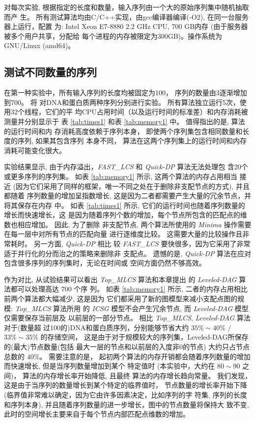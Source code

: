 对每次实验, 根据指定的长度和数量，输入序列由一个大的原始序列集中随机抽取而产
生。 所有测试算法均由C/C++实现，由gcc编译器编译(-O2), 在同一台服务器上运行，配置
为: Intel Xeon E7-8880 2.2 GHz CPU, 700 GB内存 (由于服务器被多个用户共享，分配给
每个进程的内存被限定为300GB)。操作系统为 GNU/Linux (amd64)。

\subsection{测试不同数量的序列}
\label{sec:number}

在第一种实验中，所有输入序列的长度均被固定为100， 序列的数量由3逐渐增加到700。 将
对DNA和蛋白质两种序列分别进行实验。 所有算法独立运行5次，使用32个线程，它们的平
均CPU占用时间（以及运行时间的标准差）和内存消耗被测量并分别显示于
表 \ref{tab:times1} 和表 \ref{tab:memory1} 中。 值得指出的是, 算法的运行时间和内
存消耗高度依赖于序列本身， 即使两个序列集包含相同数量和长度的序列, 如果其包含序列
本身不同， 算法在这两个序列集上的运行时间和内存消耗可能变化很大。

实验结果显示, 由于内存溢出，\emph{FAST\_LCS} 和 \emph{Quick-DP} 算法无法处理包
含20个或更多序列的序列集。 如表 \ref{tab:memory1} 所示, 这两个算法的内存占用相当
接近 (因为它们采用了同样的框架，唯一不同之处在于删除非支配节点的方式), 并且都随着
序列数量的增加呈指数增长, 这是因为二者都需要产生大量的冗余节点，并将其保存在内存
中。 如表 \ref{tab:times1} 所示, 它们的运行时间也随着序列数量的增长而快速增长，这
是因为随着序列个数的增加，每个节点所包含的匹配点的维数也相应增加。 因此, 为了删除
非支配节点, 两个算法所使用的 \emph{Minima} 操作需要在每一层中对所有节点的匹配向量
进行逐维度比较。 这需要大量的比较操作且非常耗时。 另一方面, \emph{Quick-DP} 相比
较 \emph{FAST\_LCS} 要快很多，因为它采用了非常适于并行化的分而治之的策略来删除非
支配点。 遗憾的是, \emph{Quick-DP} 算法在应对包含很多序列的序列集时，无论在时间或
空间方面仍然不够高效。

作为对比, 从试验结果可以看出 \emph{Top\_MLCS} 算法和本章提出
的 \emph{Leveled-DAG} 算法都可以处理高达 700 个序
列。 如表 \ref{tab:memory1} 所示, 二者的内存占用相比前两个算法都大幅减少, 这是因为
它们都采用了新的图模型来减小支配点图的规模: \emph{Top\_MLCS} 算法所用
的 \emph{ICSG} 模型不会产生冗余节点, 而 \emph{Leveled-DAG} 模型仅需要保存当前层及
以前层的一部分节点。 相比 \emph{Top\_MLCS}, \emph{Leveled-DAG} 算法对于(数量超
过100的)DNA和蛋白质序列，分别能够节省大约 $35\% \sim 40\%$ $/$ $33\% \sim 35\%$
的存储空间， 这是由于对于规模较大的序列集，Leveled-DAG所保存的(最大)节点数量(包括
最大一层的节点和以前层的入度非0的节点) 大约只占节点总数的 $40\%$。 需要注意的是，
起初两个算法的内存开销都会随着序列数量的增加而快速增长, 但是当序列数量增加到某个
特定值时 (本实验中，大约在 $80 \sim 90$ 之间)， 算法的内存增长率开始降低, 且最终
算法的内存增长趋向常量。 我们发现，这是由于当序列的数量增长到某个特定的临界值时，
节点数量的增长率开始下降 (临界值非常难以确定，因为它由许多因素决定，比如序列的字
符集, 序列的长度和序列本身), 并且随着序列数量的进一步增长，图中的节点数量将保持大
致不变, 此时的空间增长主要来自于每个节点内部匹配点维数的增加。

